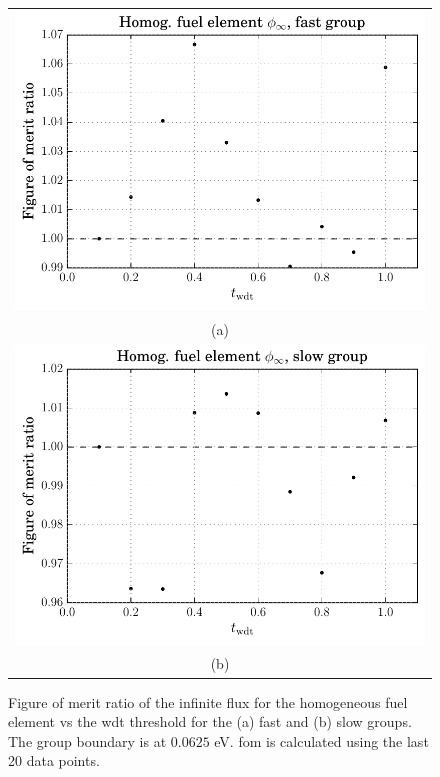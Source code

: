 \begin{figure}[hbtp]
  \centering
  \begin{tabular}{c}
  \includegraphics[scale=0.9]{images/results/homog_inf_flx_grp_comb1} \\
    (a) \\
  \includegraphics[scale=0.9]{images/results/homog_inf_flx_grp_comb2} \\
    (b) 
  \end{tabular}
  \caption[Figure of merit ratio of the infinite flux for the
  homogeneous fuel element]{Figure of merit ratio of the infinite flux
    for the homogeneous fuel element vs the
    \gls{wdt} threshold for the (a) fast and (b) slow 
    groups. The group boundary is at $0.0625$ eV. \gls{fom} is
    calculated using the last 20 data points.}
  \label{fig:homog_inf_flx}
\end{figure}


